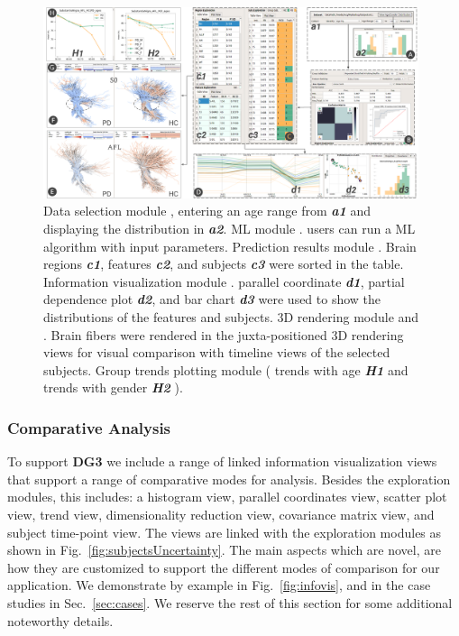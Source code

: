 \begin{figure}[t!]
\centering
\includegraphics[width=0.98\textwidth]{images/SNSteps_v5.png}%
\caption{ Data selection module , entering an age range from \textbf{\textit{a1}} and displaying the distribution in \textbf{\textit{a2}}. ML module . users can run a ML algorithm with input parameters. Prediction results module . Brain regions \textbf{\textit{c1}}, features \textbf{\textit{c2}}, and subjects \textbf{\textit{c3}} were sorted in the table. Information visualization module . parallel coordinate \textbf{\textit{d1}}, partial dependence plot \textbf{\textit{d2}}, and bar chart \textbf{\textit{d3}} were used to show the distributions of the features and subjects. 3D rendering module  and . Brain fibers were rendered in the juxta-positioned 3D rendering views for visual comparison with timeline views   of the selected subjects. Group trends plotting module  ( trends with age \textbf{\textit{H1}} and trends with gender \textbf{\textit{H2}} ).}
\label{fig:SNSteps}
\end{figure}


\subsubsection{Comparative Analysis}
\label{sec:comparison}

\noindent To support \textbf{DG3} we include a range of linked information visualization views that support a range of comparative modes for analysis. Besides the exploration modules, this includes: a histogram view, parallel coordinates view, scatter plot view, trend view, dimensionality reduction view, covariance matrix view, and subject time-point view. The views are linked with the exploration modules as shown in Fig.~\ref{fig:subjectsUncertainty}. The main aspects which are novel, are how they are customized to support the different modes of comparison for our application. We demonstrate by example in Fig.~\ref{fig:infovis}, and in the case studies in Sec.~\ref{sec:cases}. We reserve the rest of this section for some additional noteworthy details.  


